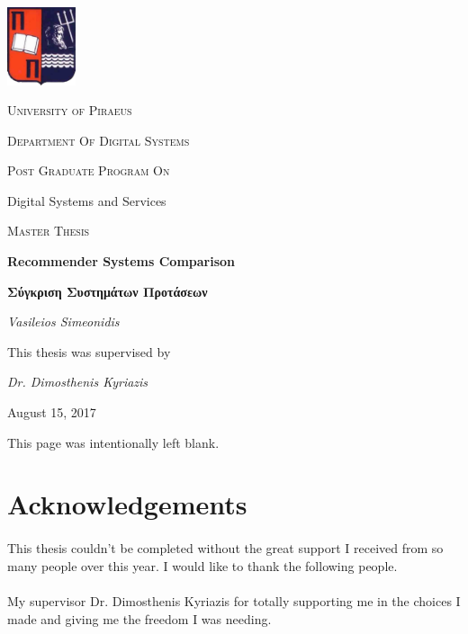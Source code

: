 \documentclass[10pt, a4paper, oneside]{journal}
\begin{document}
	\begin{titlepage}
		\centering
		\includegraphics[width=0.15\textwidth]{../images/UniversityOfPiraeusLogo.png}\par\vspace{1cm}
		{\scshape\LARGE University of Piraeus \par}
		\vspace{1cm}
		{\scshape\Large Department Of Digital Systems \par}
		\vspace{1cm}
		{\scshape\Large Post Graduate Program On \par Digital Systems and Services \par}
		\vspace{1cm}
		{\scshape\Large Master Thesis\par}
		\vspace{1cm}
		{\huge\bfseries Recommender Systems Comparison\par}
		\vspace{2cm}
		{\bfseries \large Σύγκριση Συστημάτων Προτάσεων\par}
		\vfill
		{\Large\itshape Vasileios Simeonidis\par}
	\end{titlepage}
	
	\newpage 
	{
		\centering
		This thesis was supervised by\par
		\textit{Dr. Dimosthenis Kyriazis}
		\vfill
		{\large August 15, 2017\par}
	}
	\clearpage
	\begin{center}
		This page was intentionally left blank.
	\end{center}
	\newpage
	\section{Acknowledgements}
	
	\paragraph{} This thesis couldn't be completed without the great support I received from so many people over this year. I would like to thank the following people.
	
	\paragraph{} My supervisor Dr. Dimosthenis Kyriazis for totally supporting me in the choices I made and giving me the freedom I was needing.
	
\end{document}
